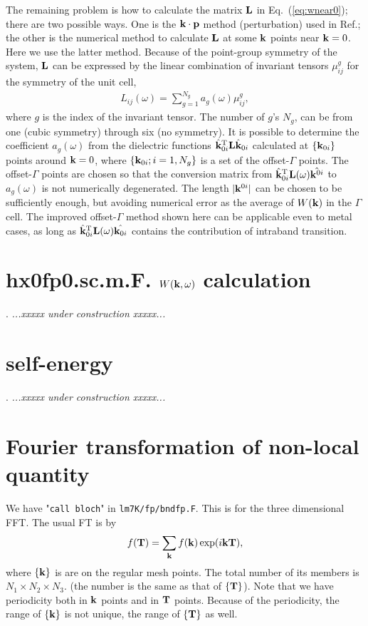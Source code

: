 \documentclass[a4paper,10pt,epsf,fleqn]{article}
\def\bfp{{\bf p}}
\def\underconstruction{{\it...xxxxx under construction xxxxx...\\}}
\newcommand{\bfq}{{\bf q}}
\newcommand{\bfk}{{\bf k}}
\newcommand{\bfT}{{\bf T}}
\newcommand{\req}[1]{\mbox{Eq.~(\ref{#1})}}
\begin{document}
The remaining problem is how to calculate
the matrix ${\bf L}$ in \req{eq:wnear0}; there are two possible ways.
One is the $\bfk \cdot \bfp$ method (perturbation) used in Ref.\cite{friedrich_efficient_2010}; 
the other is the numerical method to calculate ${\bf L}$ at some
$\bfk$ points near $\bfk=0$. Here we use the latter method.
Because of the point-group symmetry of the system, ${\bf L}$ can be expressed by the
linear combination of invariant tensors $\mu_{ij}^g$ for the symmetry of the unit cell,
\begin{eqnarray}
L_{ij}(\omega)=  \sum_{g=1}^{N_g} a_g(\omega) \mu_{ij}^g,
\end{eqnarray}
where $g$ is the index of the invariant tensor. 
The number of $g$'s $N_g$, can be
from one (cubic symmetry) through six (no symmetry).
It is possible to determine the coefficient $a_g(\omega)$
from the dielectric functions ${\hat{\bfk}_{0i}}^{\rm T}{\bf L}\hat{\bfk}_{0i}$
calculated at $\{\bfk_{0i}\}$ points around
$\bfk=0$, where $\{\bfk_{0i}; i=1,N_g\}$ is a set of the offset-$\Gamma$ points.
The offset-$\Gamma$ points are chosen so that the conversion matrix
from $\hat{\bfk}_{0i}^{\rm T}{\bf L}(\omega)\hat{\bfk^{0i}}$ to $a_g(\omega)$
is not numerically degenerated. The length $|\bfk^{0i}|$
can be chosen to be sufficiently enough, but avoiding numerical error
%
as the average of $W(\bfk)$ in the $\Gamma$ cell.
The improved offset-$\Gamma$ method shown here can be applicable even to metal cases, as long as
$\hat{\bfk}_{0i}^{\rm T}{\bf L}(\omega)\hat{\bfk_{0i}}$ contains the contribution
of intraband transition.

\section{hx0fp0.sc.m.F. $W(\bfk,\omega)$ calculation}.
\underconstruction


\section{self-energy}.
\underconstruction

\section{Fourier transformation of non-local quantity}
We have "{\tt call bloch}" in {\tt lm7K/fp/bndfp.F}.
This is for the three dimensional FFT.
The usual FT is by
\begin{eqnarray}
f(\bfT)=\sum_\bfk f(\bfk) \exp(i \bfk \bfT),
\end{eqnarray}
where $\{\bfk\}$ is are on the regular mesh points.
The total number of its members is $N_1 \times N_2 \times N_3$.
(the number is the same as that of $\{\bfT\}$).
Note that we have periodicity both in $\bfk$ points
and in $\bfT$ points. Because of the periodicity, the range of $\{\bfk\}$
is not unique, the range of $\{\bfT\}$ as well.
\end{document}
